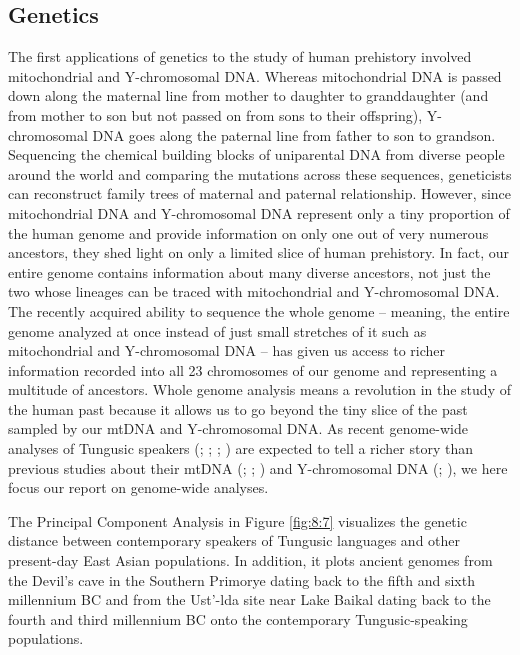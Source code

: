 \documentclass[output=paper,colorlinks,citecolor=brown]{langscibook}
\begin{document}
\subsection{Genetics}\label{Section8.5.3}

The first applications of genetics to the study of human prehistory involved mitochondrial and Y-chromosomal DNA. Whereas mitochondrial DNA is passed down along the maternal line from mother to daughter to granddaughter (and from mother to son but not passed on from sons to their offspring), Y-chro\-mo\-somal DNA goes along the paternal line from father to son to grandson. Sequencing the chemical building blocks of uniparental DNA from diverse people around the world and comparing the mutations across these sequences, geneticists can reconstruct family trees of maternal and paternal relationship. However, since mitochondrial DNA and Y-chromosomal DNA represent only a tiny proportion of the human genome and provide information on only one out of very numerous ancestors, they shed light on only a limited slice of human prehistory. In fact, our entire genome contains information about many diverse ancestors, not just the two whose lineages can be traced with mitochondrial and Y-chromosomal DNA. The recently acquired ability to sequence the whole genome – meaning, the entire genome analyzed at once instead of just small stretches of it such as mitochondrial and Y-chromosomal DNA – has given us access to richer information recorded into all 23 chromosomes of our genome and representing a multitude of ancestors. Whole genome analysis means a revolution in the study of the human past because it allows us to go beyond the tiny slice of the past sampled by our mtDNA and Y-chromosomal DNA. As recent genome-wide analyses of Tungusic speakers (\citealt{Pugach2016}; \citealt{Siska2017}; \citealt{Wang2021}; \citealt{WangRobbeets2020}) are expected to tell a richer story than previous studies about their mtDNA (\citealt{Starikovskaya2005}; \citealt{Sukernik2012}; \citealt{Duggan2013}) and Y-chromosomal DNA (\citealt{Malyarchuk2010}; \citealt{Duggan2013}), we here focus our report on genome-wide analyses.

The Principal Component Analysis in Figure \ref{fig:8:7} visualizes the genetic distance between contemporary speakers of Tungusic languages and other present-day East Asian populations. In addition, it plots ancient genomes from the Devil’s cave in the Southern Primorye dating back to the fifth and sixth millennium BC and from the Ust’-lda site near Lake Baikal dating back to the fourth and third millennium BC onto the contemporary Tungusic-speaking populations. 
\end{document}
